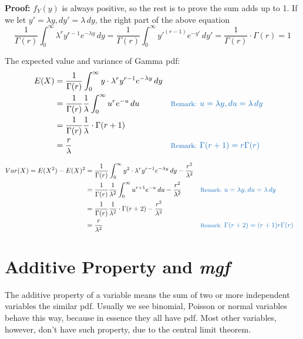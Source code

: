 \documentclass[11pt]{article}
\begin{document}
\textbf{Proof:} $f_Y(y)$ is always positive,  so the rest is to prove the sum adds up to 1.   If we let $y' = \lambda y,  dy' = \lambda \, dy$, the right part of the above equation
\[
\frac{1}{\Gamma(r)} \int _0 ^\infty \lambda ^r y^{r-1} e^{-\lambda y} \, dy
	= \frac{1}{\Gamma(r)}  \int _0 ^\infty {y'}^{(r-1)} e^{-y'} \, dy' 
	= \frac{1}{\Gamma(r)} \cdot  \Gamma(r)
	= 1
\]

The expected value and variance of Gamma pdf:
\[
\begin{aligned}
E(X)
	&= \frac{1}{\Gamma(r)} \int _0 ^\infty  y \cdot \lambda ^r y^{r-1} e^{-\lambda y} \, dy \\
	&= \frac{1}{\Gamma(r)} \frac{1}{\lambda} \int _0 ^\infty  u^r e^{-u} \, du && \color{RoyalBlue}  \text{\footnotesize Remark: } u = \lambda y, du = \lambda \,dy \\
	&= \frac{1}{\Gamma(r)} \frac{1}{\lambda} \cdot \Gamma(r+1) \\
	&= \frac{r}{\lambda} && \color{RoyalBlue}  \text{\footnotesize Remark: } \Gamma(r+1)= r \Gamma(r) \\
\end{aligned}
\]

\[
\begin{aligned}
Var(X)
	= E(X^2) - E(X)^2 
	&=\frac{1}{\Gamma(r)} \int _0 ^\infty  y^2 \cdot \lambda ^r y^{r-1} e^{-\lambda y} \, dy  - \frac{r^2}{\lambda ^2} \\
	&= \frac{1}{\Gamma(r)} \frac{1}{\lambda ^2} \int _0 ^\infty  u^{r+1} e^{-u} \, du  - \frac{r^2}{\lambda ^2} && \color{RoyalBlue}  \text{\footnotesize Remark: } u = \lambda y, du = \lambda \,dy \\
	&= \frac{1}{\Gamma(r)} \frac{1}{\lambda ^2} \cdot \Gamma(r+2) - \frac{r^2}{\lambda ^2} \\
	&= \frac{r}{\lambda ^2} && \color{RoyalBlue}  \text{\footnotesize Remark: } \Gamma(r+2)= (r+1)r \Gamma(r) \\
\end{aligned}
\]



\section{\normalsize Additive Property and \textit{mgf} }

The additive property of a variable means the sum of two or more independent variables  the similar pdf.   Usually we see binomial,  Poisson or normal variables behave this way,  because in essence they all have  pdf.   Most other variables,  however,  don't have such property,  due to the central limit theorem.  
\end{document}
